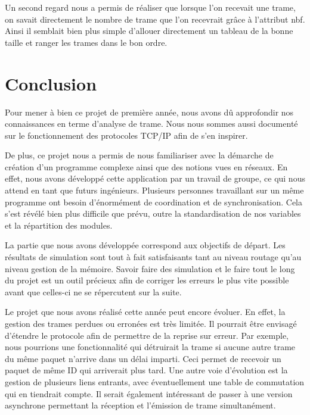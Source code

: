 \documentclass[a4paper,11pt]{article}
\begin{document}
Un second regard nous a permis de réaliser que lorsque l'on recevait une trame, on savait directement le nombre de trame que l'on recevrait grâce à l'attribut nbf. Ainsi il semblait bien plus simple d'allouer directement un tableau de la bonne taille et ranger les trames dans le bon ordre.

\section{Conclusion}

Pour mener à bien ce projet de première année, nous avons dû approfondir nos connaissances en terme d'analyse de trame. Nous nous sommes aussi documenté sur le fonctionnement des protocoles TCP/IP afin de s'en inspirer.

De plus, ce projet nous a permis de nous familiariser avec la démarche de création d’un programme complexe ainsi  que des notions vues en réseaux. En effet, nous avons développé cette application par un travail de groupe, ce qui nous attend en tant que futurs ingénieurs. Plusieurs personnes travaillant sur un même programme ont besoin d'énormément de coordination et de synchronisation. Cela s'est révélé bien plus difficile que prévu, outre la standardisation de nos variables et la répartition des modules.

La partie que nous avons développée correspond aux objectifs de départ. Les résultats de simulation sont tout à fait satisfaisants tant au niveau routage qu'au niveau gestion de la mémoire. Savoir faire des simulation et le faire tout le long du projet est un outil précieux afin de corriger les erreurs le plus vite possible avant que celles-ci ne se répercutent sur la suite.

Le projet que nous avons réalisé cette année peut encore évoluer.
En effet, la gestion des trames perdues ou erronées est très limitée.
Il pourrait être envisagé d'étendre le protocole afin de permettre de la
reprise sur erreur. Par exemple, nous pourrions une fonctionnalité qui détruirait la trame si aucune autre trame du même paquet 
n'arrive dans un délai imparti. Ceci permet de recevoir un paquet de
même ID qui arriverait plus tard. Une autre voie d'évolution est la
gestion de plusieurs liens entrants, avec éventuellement une table de
commutation qui en tiendrait compte. Il serait également intéressant de
passer à une version asynchrone permettant la réception et l'émission de
trame simultanément.
\end{document}
